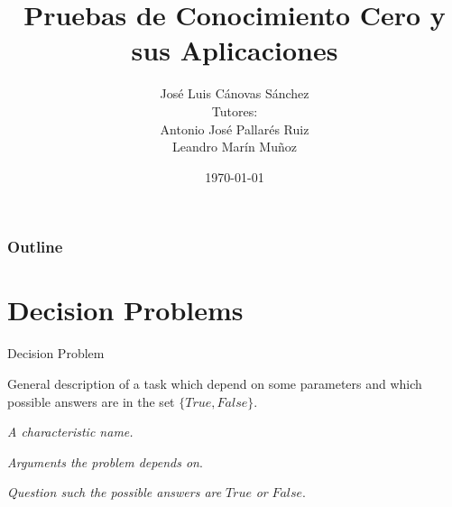 \documentclass{beamer}
\title{Pruebas de Conocimiento Cero y sus Aplicaciones}
\date{\today}
\author{José Luis Cánovas Sánchez\\[3mm]\scriptsize Tutores:\\Antonio José Pallarés Ruiz\\Leandro Marín Muñoz}
\institute{Universidad de Murcia\\Facultad de Matemáticas}
\begin{document}
\maketitle

\begin{frame}
	\frametitle{Outline}
	\tableofcontents
\end{frame}

\section{Decision Problems}

\begin{frame}{Decision Problem}
	\begin{definition}
		General description of a task which depend on some parameters and which possible answers are in the set $\{True, False \}$.
	\end{definition}
	\begin{description}[Parameters]
		\item[Name] \textit{A characteristic name.}
		\item[Parameters] \textit{Arguments the problem depends on}.
		\item[Question] \textit{Question such the possible answers are} $True$ \textit{or} $False$.
	\end{description}
\end{frame}
\end{document}
